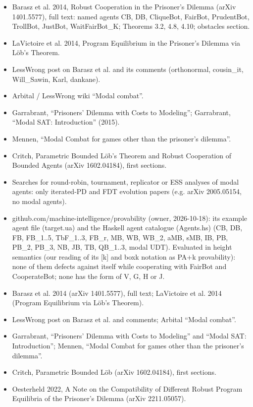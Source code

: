 \documentclass{article}
\begin{document}
\begin{itemize}
\item Barasz et al. 2014, Robust Cooperation in the Prisoner's Dilemma (arXiv 1401.5577), full text: named agents CB, DB, CliqueBot, FairBot, PrudentBot, TrollBot, JustBot, WaitFairBot\_K; Theorems 3.2, 4.8, 4.10; obstacles section.
\item LaVictoire et al. 2014, Program Equilibrium in the Prisoner's Dilemma via Löb's Theorem.
\item LessWrong post on Barasz et al. and its comments (orthonormal, cousin\_it, Will\_Sawin, Karl, dankane).
\item Arbital / LessWrong wiki ``Modal combat''.
\item Garrabrant, ``Prisoners' Dilemma with Costs to Modeling''; Garrabrant, ``Modal SAT: Introduction'' (2015).
\item Mennen, ``Modal Combat for games other than the prisoner's dilemma''.
\item Critch, Parametric Bounded Löb's Theorem and Robust Cooperation of Bounded Agents (arXiv 1602.04184), first sections.
\item Searches for round-robin, tournament, replicator or ESS analyses of modal agents: only iterated-PD and FDT evolution papers (e.g. arXiv 2005.05154, no modal agents).
\item github.com/machine-intelligence/provability (owner, 2026-10-18): its example agent file (target.ua) and the Haskell agent catalogue (Agents.hs) (CB, DB, FB, FB\_1..5, TbF\_1..3, FB\_r, MB, WB, WB\_2, aMB, sMB, IB, PB, PB\_2, PB\_3, NB, JB, TB, QB\_1..3, modal UDT). Evaluated in height semantics (our reading of its [k] and boxk notation as PA+k provability): none of them defects against itself while cooperating with FairBot and CooperateBot; none has the form of V, G, H or J.
\item Barasz et al. 2014 (arXiv 1401.5577), full text; LaVictoire et al. 2014 (Program Equilibrium via Löb's Theorem).
\item LessWrong post on Barasz et al. and comments; Arbital ``Modal combat''.
\item Garrabrant, ``Prisoners' Dilemma with Costs to Modeling'' and ``Modal SAT: Introduction''; Mennen, ``Modal Combat for games other than the prisoner's dilemma''.
\item Critch, Parametric Bounded Löb (arXiv 1602.04184), first sections.
\item Oesterheld 2022, A Note on the Compatibility of Different Robust Program Equilibria of the Prisoner's Dilemma (arXiv 2211.05057).
\end{itemize}
\end{document}

